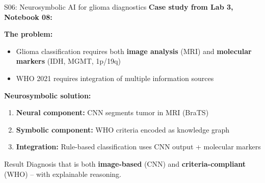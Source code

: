\documentclass[aspectratio=169, 10pt]{beamer}
\begin{document}
\begin{frame}{S06: Neurosymbolic AI for glioma diagnostics}
    \textbf{Case study from Lab 3, Notebook 08:}
    
    \vspace{0.3cm}
    \textbf{The problem:}
    \begin{itemize}
        \item Glioma classification requires both \textbf{image analysis} (MRI) and \textbf{molecular markers} (IDH, MGMT, 1p/19q)
        \item WHO 2021 requires integration of multiple information sources
    \end{itemize}
    
    \vspace{0.3cm}
    \textbf{Neurosymbolic solution:}
    \begin{enumerate}
        \item \textbf{Neural component:} CNN segments tumor in MRI (BraTS)
        \item \textbf{Symbolic component:} WHO criteria encoded as knowledge graph
        \item \textbf{Integration:} Rule-based classification uses CNN output + molecular markers
    \end{enumerate}
    
    \vspace{0.3cm}
    \begin{block}{Result}
        Diagnosis that is both \textbf{image-based} (CNN) and \textbf{criteria-compliant} (WHO) -- with explainable reasoning.
    \end{block}
\end{frame}
\end{document}
